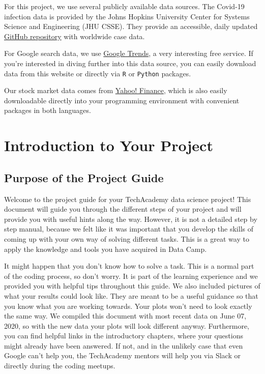 \documentclass[
  11pt,
]{article}
\begin{document}
For this project, we use several publicly available data sources. The Covid-19 infection data is provided by the Johns Hopkins University Center for Systems Science and Engineering (JHU CSSE). They provide an accessible, daily updated \href{https://github.com/CSSEGISandData/COVID-19}{GitHub repository} with worldwide case data.

For Google search data, we use \href{https://trends.google.com/}{Google Trends}, a very interesting free service. If you're interested in diving further into this data source, you can easily download data from this website or directly via \texttt{R} or \texttt{Python} packages.

Our stock market data comes from \href{finance.yahoo.com}{Yahoo! Finance}, which is also easily downloadable directly into your programming environment with convenient packages in both languages.

\newpage

\hypertarget{introduction-to-your-project}{%
\section{Introduction to Your Project}\label{introduction-to-your-project}}

\hypertarget{purpose-of-the-project-guide}{%
\subsection{Purpose of the Project Guide}\label{purpose-of-the-project-guide}}

Welcome to the project guide for your TechAcademy data science project! This document will guide you through the different steps of your project and will provide you with useful hints along the way. However, it is not a detailed step by step manual, because we felt like it was important that you develop the skills of coming up with your own way of solving different tasks. This is a great way to apply the knowledge and tools you have acquired in Data Camp.

It might happen that you don't know how to solve a task. This is a normal part of the coding process, so don't worry. It is part of the learning experience and we provided you with helpful tips throughout this guide. We also included pictures of what your results could look like. They are meant to be a useful guidance so that you know what you are working towards. Your plots won't need to look exactly the same way. We compiled this document with most recent data on June 07, 2020, so with the new data your plots will look different anyway.
Furthermore, you can find helpful links in the introductory chapters, where your questions might already have been answered. If not, and in the unlikely case that even Google can't help you, the TechAcademy mentors will help you via Slack or directly during the coding meetups.
\end{document}
